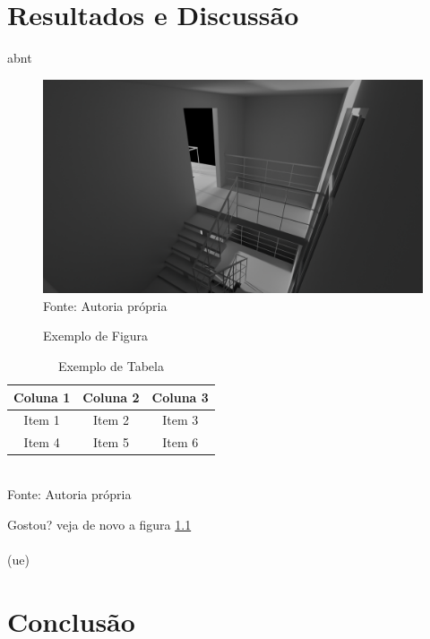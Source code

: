 \documentclass[12pt,a4paper,oneside,brazil]{abntex2}
\begin{document}
\chapter{Resultados e Discussão}
\lipsum[10]
\gls{abnt}

\begin{figure}[ht]
    \centering
    \caption{Exemplo de Figura}
    \includegraphics[width=1.0\textwidth]{./src/assets/untitled.png}
    \label{fig:exemplo}
    \textnormal{\fontsize{10pt}{12pt}Fonte: Autoria própria}
\end{figure}

\begin{table}[ht]
    \centering
    \caption{Exemplo de Tabela}
    \begin{tabular}{|c|c|c|}
        \hline
        Coluna 1 & Coluna 2 & Coluna 3 \\ \hline
        Item 1   & Item 2   & Item 3   \\ \hline
        Item 4   & Item 5   & Item 6   \\ \hline
    \end{tabular}
    \label{tab:exemplo}
    \\\textnormal{\fontsize{10pt}{12pt}Fonte: Autoria própria}
\end{table}

\lipsum[1-2]

Gostou? veja de novo a figura \ref{fig:exemplo}\\\\
(\acrshort{ue})

\chapter{Conclusão}
\lipsum[11-12]


\end{document}
